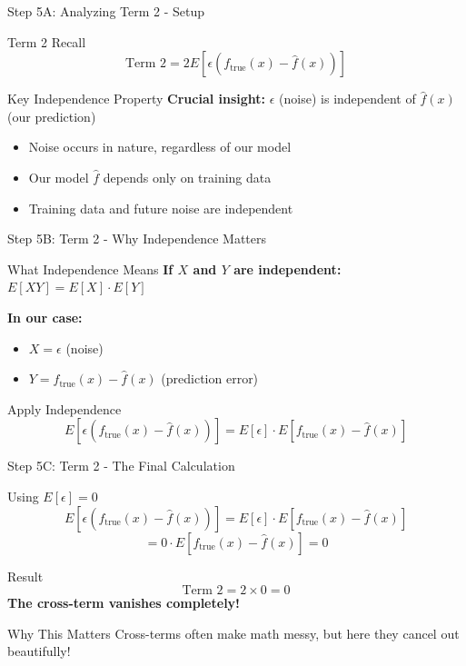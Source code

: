 \documentclass[10pt]{beamer}
\begin{document}
\begin{frame}{Step 5A: Analyzing Term 2 - Setup}
\begin{definitionbox}{Term 2 Recall}
$$\text{Term 2} = 2E[\epsilon(f_{\text{true}}(x) - \hat{f}(x))]$$
\end{definitionbox}

\begin{keypointsbox}{Key Independence Property}
\textbf{Crucial insight:} $\epsilon$ (noise) is independent of $\hat{f}(x)$ (our prediction)
\begin{itemize}
\item Noise occurs in nature, regardless of our model
\item Our model $\hat{f}$ depends only on training data
\item Training data and future noise are independent
\end{itemize}
\end{keypointsbox}
\end{frame}

\begin{frame}{Step 5B: Term 2 - Why Independence Matters}
\begin{examplebox}{What Independence Means}
\textbf{If $X$ and $Y$ are independent:} $E[XY] = E[X] \cdot E[Y]$

\textbf{In our case:}
\begin{itemize}
\item $X = \epsilon$ (noise)
\item $Y = f_{\text{true}}(x) - \hat{f}(x)$ (prediction error)
\end{itemize}
\end{examplebox}

\begin{keypointsbox}{Apply Independence}
$$E[\epsilon(f_{\text{true}}(x) - \hat{f}(x))] = E[\epsilon] \cdot E[f_{\text{true}}(x) - \hat{f}(x)]$$
\end{keypointsbox}
\end{frame}

\begin{frame}{Step 5C: Term 2 - The Final Calculation}
\begin{examplebox}{Using $E[\epsilon] = 0$}
$$E[\epsilon(f_{\text{true}}(x) - \hat{f}(x))] = E[\epsilon] \cdot E[f_{\text{true}}(x) - \hat{f}(x)]$$
$$= 0 \cdot E[f_{\text{true}}(x) - \hat{f}(x)] = 0$$
\end{examplebox}

\begin{alertbox}{Result}
$$\boxed{\text{Term 2} = 2 \times 0 = 0}$$
\textbf{The cross-term vanishes completely!}
\end{alertbox}

\begin{keypointsbox}{Why This Matters}
Cross-terms often make math messy, but here they cancel out beautifully!
\end{keypointsbox}
\end{frame}
\end{document}
